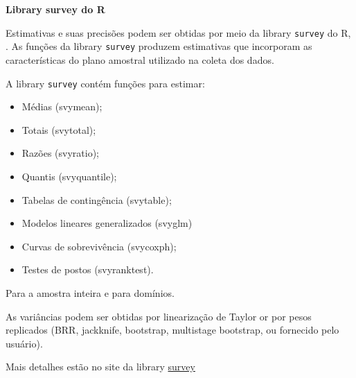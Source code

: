 \documentclass[]{book}
\providecommand{\tightlist}{%
  \setlength{\itemsep}{0pt}\setlength{\parskip}{0pt}}
\theoremstyle{definition}
\theoremstyle{definition}
\theoremstyle{definition}
\theoremstyle{remark}
\begin{document}
\textbf{Library survey do R}

Estimativas e suas precisões podem ser obtidas por meio da library
\texttt{survey} do R, \citep{R-survey}. As funções da library
\texttt{survey} produzem estimativas que incorporam as características
do plano amostral utilizado na coleta dos dados.

A library \texttt{survey} contém funções para estimar:

\begin{itemize}
\tightlist
\item
  Médias (svymean);
\item
  Totais (svytotal);
\item
  Razões (svyratio);
\item
  Quantis (svyquantile);
\item
  Tabelas de contingência (svytable);
\item
  Modelos lineares generalizados (svyglm)
\item
  Curvas de sobrevivência (svycoxph);
\item
  Testes de postos (svyranktest).
\end{itemize}

Para a amostra inteira e para domínios.

As variâncias podem ser obtidas por linearização de Taylor or por pesos
replicados (BRR, jackknife, bootstrap, multistage bootstrap, ou
fornecido pelo usuário).

Mais detalhes estão no site da library
\href{http://r-survey.r-forge.r-project.org/survey/}{survey}


\end{document}
